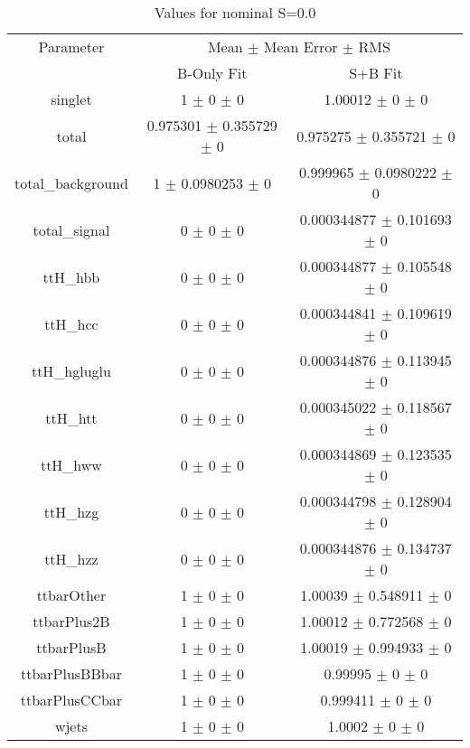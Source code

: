 \begin{table}
\centering
\caption{Values for nominal S=0.0}
\begin{tabular}{ccc}
\toprule
Parameter & \multicolumn{2}{c}{Mean $\pm$ Mean Error $\pm$ RMS}\\
 & B-Only Fit & S+B Fit\\
\midrule
singlet & \num{1} $\pm$ \num{0} $\pm$ \num{0} & \num{1.00012} $\pm$ \num{0} $\pm$ \num{0}\\
total & \num{0.975301} $\pm$ \num{0.355729} $\pm$ \num{0} & \num{0.975275} $\pm$ \num{0.355721} $\pm$ \num{0}\\
total\_background & \num{1} $\pm$ \num{0.0980253} $\pm$ \num{0} & \num{0.999965} $\pm$ \num{0.0980222} $\pm$ \num{0}\\
total\_signal & \num{0} $\pm$ \num{0} $\pm$ \num{0} & \num{0.000344877} $\pm$ \num{0.101693} $\pm$ \num{0}\\
ttH\_hbb & \num{0} $\pm$ \num{0} $\pm$ \num{0} & \num{0.000344877} $\pm$ \num{0.105548} $\pm$ \num{0}\\
ttH\_hcc & \num{0} $\pm$ \num{0} $\pm$ \num{0} & \num{0.000344841} $\pm$ \num{0.109619} $\pm$ \num{0}\\
ttH\_hgluglu & \num{0} $\pm$ \num{0} $\pm$ \num{0} & \num{0.000344876} $\pm$ \num{0.113945} $\pm$ \num{0}\\
ttH\_htt & \num{0} $\pm$ \num{0} $\pm$ \num{0} & \num{0.000345022} $\pm$ \num{0.118567} $\pm$ \num{0}\\
ttH\_hww & \num{0} $\pm$ \num{0} $\pm$ \num{0} & \num{0.000344869} $\pm$ \num{0.123535} $\pm$ \num{0}\\
ttH\_hzg & \num{0} $\pm$ \num{0} $\pm$ \num{0} & \num{0.000344798} $\pm$ \num{0.128904} $\pm$ \num{0}\\
ttH\_hzz & \num{0} $\pm$ \num{0} $\pm$ \num{0} & \num{0.000344876} $\pm$ \num{0.134737} $\pm$ \num{0}\\
ttbarOther & \num{1} $\pm$ \num{0} $\pm$ \num{0} & \num{1.00039} $\pm$ \num{0.548911} $\pm$ \num{0}\\
ttbarPlus2B & \num{1} $\pm$ \num{0} $\pm$ \num{0} & \num{1.00012} $\pm$ \num{0.772568} $\pm$ \num{0}\\
ttbarPlusB & \num{1} $\pm$ \num{0} $\pm$ \num{0} & \num{1.00019} $\pm$ \num{0.994933} $\pm$ \num{0}\\
ttbarPlusBBbar & \num{1} $\pm$ \num{0} $\pm$ \num{0} & \num{0.99995} $\pm$ \num{0} $\pm$ \num{0}\\
ttbarPlusCCbar & \num{1} $\pm$ \num{0} $\pm$ \num{0} & \num{0.999411} $\pm$ \num{0} $\pm$ \num{0}\\
wjets & \num{1} $\pm$ \num{0} $\pm$ \num{0} & \num{1.0002} $\pm$ \num{0} $\pm$ \num{0}\\
\bottomrule
\end{tabular}
\end{table}